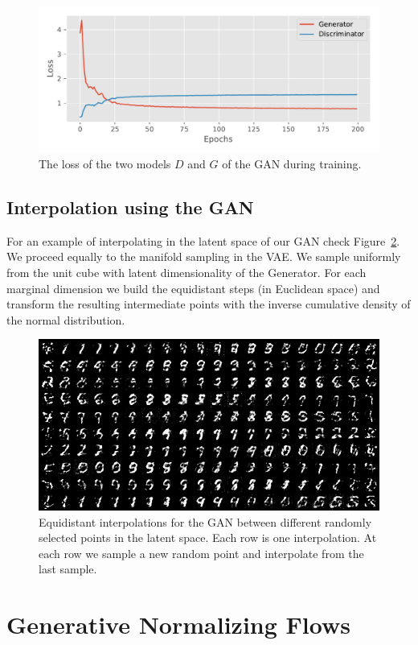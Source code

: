\documentclass{article}
\begin{document}
\begin{figure}
  \centering
  \includegraphics[width=0.6\linewidth]{assignment_3/code/figures/gan.pdf}
  \caption{The loss of the two models \(D\) and \(G\) of the GAN during training.}
  \label{fig:gan_loss}
\end{figure}

\subsection{Interpolation using the GAN}
For an example of interpolating in the latent space of our GAN check Figure~\ref{fig:gan_interpolation}.
We proceed equally to the manifold sampling in the VAE.
We sample uniformly from the unit cube with latent dimensionality of the Generator.
For each marginal dimension we build the equidistant steps (in Euclidean space) and transform the resulting intermediate points with the inverse cumulative density of the normal distribution.

\begin{figure}
  \centering
  \includegraphics[width=0.9\linewidth]{assignment_3/code/figures/gan_interpolate.png}
  \caption{Equidistant interpolations for the GAN between different randomly selected points in the latent space. Each row is one interpolation. At each row we sample a new random point and interpolate from the last sample.}
  \label{fig:gan_interpolation}
\end{figure}

\section{Generative Normalizing Flows}
\end{document}
